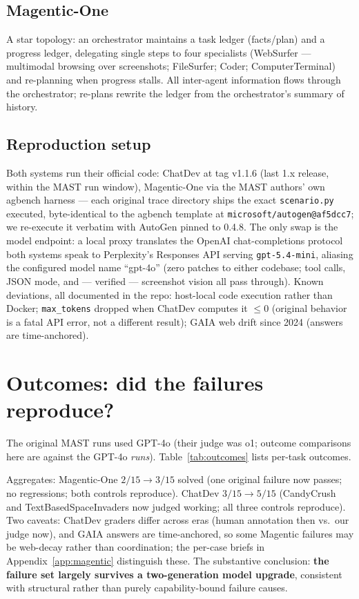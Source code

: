 \documentclass[11pt]{article}
\begin{document}
\subsection{Magentic-One}
A star topology: an orchestrator maintains a task ledger (facts/plan) and a
progress ledger, delegating single steps to four specialists (WebSurfer ---
multimodal browsing over screenshots; FileSurfer; Coder; ComputerTerminal)
and re-planning when progress stalls. All inter-agent information flows
through the orchestrator; re-plans rewrite the ledger from the orchestrator's
summary of history.

\subsection{Reproduction setup}
Both systems run their official code: ChatDev at tag v1.1.6 (last 1.x
release, within the MAST run window), Magentic-One via the MAST authors' own
agbench harness --- each original trace directory ships the exact
\texttt{scenario.py} executed, byte-identical to the agbench template at
\texttt{microsoft/autogen@af5dcc7}; we re-execute it verbatim with AutoGen
pinned to 0.4.8. The only swap is the model endpoint: a local proxy
translates the OpenAI chat-completions protocol both systems speak to
Perplexity's Responses API serving \texttt{gpt-5.4-mini}, aliasing the
configured model name ``gpt-4o'' (zero patches to either codebase; tool
calls, JSON mode, and --- verified --- screenshot vision all pass through).
Known deviations, all documented in the repo: host-local code execution
rather than Docker; \texttt{max\_tokens} dropped when ChatDev computes it
$\le 0$ (original behavior is a fatal API error, not a different result);
GAIA web drift since 2024 (answers are time-anchored).

\section{Outcomes: did the failures reproduce?}\label{sec:outcomes}

The original MAST runs used GPT-4o (their judge was o1; outcome comparisons
here are against the GPT-4o \emph{runs}). Table~\ref{tab:outcomes} lists
per-task outcomes.



Aggregates: Magentic-One $2/15 \to 3/15$ solved (one original failure now
passes; no regressions; both controls reproduce). ChatDev $3/15 \to 5/15$
(CandyCrush and TextBasedSpaceInvaders now judged working; all three controls
reproduce). Two caveats: ChatDev graders differ across eras (human annotation
then vs.\ our judge now), and GAIA answers are time-anchored, so some
Magentic failures may be web-decay rather than coordination; the per-case
briefs in Appendix~\ref{app:magentic} distinguish these. The substantive
conclusion: \textbf{the failure set largely survives a two-generation model
upgrade}, consistent with structural rather than purely capability-bound
failure causes.
\end{document}
